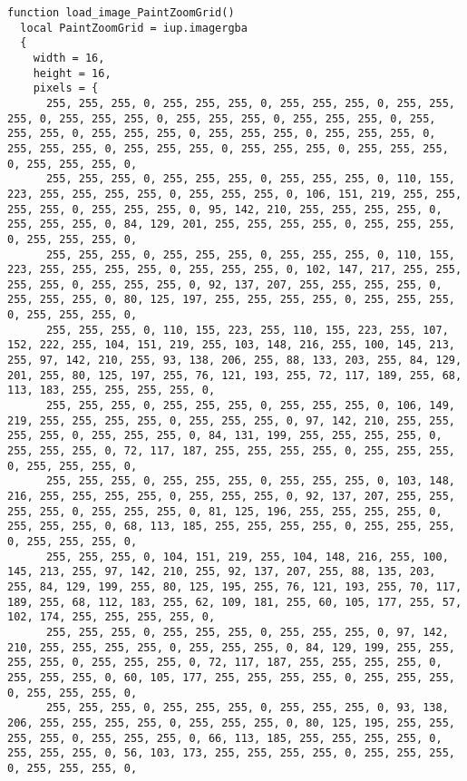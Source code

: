 \documentclass{ctexart}
\begin{document}
\begin{lstlisting}
function load_image_PaintZoomGrid()
  local PaintZoomGrid = iup.imagergba
  {
    width = 16,
    height = 16,
    pixels = {
      255, 255, 255, 0, 255, 255, 255, 0, 255, 255, 255, 0, 255, 255, 255, 0, 255, 255, 255, 0, 255, 255, 255, 0, 255, 255, 255, 0, 255, 255, 255, 0, 255, 255, 255, 0, 255, 255, 255, 0, 255, 255, 255, 0, 255, 255, 255, 0, 255, 255, 255, 0, 255, 255, 255, 0, 255, 255, 255, 0, 255, 255, 255, 0, 
      255, 255, 255, 0, 255, 255, 255, 0, 255, 255, 255, 0, 110, 155, 223, 255, 255, 255, 255, 0, 255, 255, 255, 0, 106, 151, 219, 255, 255, 255, 255, 0, 255, 255, 255, 0, 95, 142, 210, 255, 255, 255, 255, 0, 255, 255, 255, 0, 84, 129, 201, 255, 255, 255, 255, 0, 255, 255, 255, 0, 255, 255, 255, 0, 
      255, 255, 255, 0, 255, 255, 255, 0, 255, 255, 255, 0, 110, 155, 223, 255, 255, 255, 255, 0, 255, 255, 255, 0, 102, 147, 217, 255, 255, 255, 255, 0, 255, 255, 255, 0, 92, 137, 207, 255, 255, 255, 255, 0, 255, 255, 255, 0, 80, 125, 197, 255, 255, 255, 255, 0, 255, 255, 255, 0, 255, 255, 255, 0, 
      255, 255, 255, 0, 110, 155, 223, 255, 110, 155, 223, 255, 107, 152, 222, 255, 104, 151, 219, 255, 103, 148, 216, 255, 100, 145, 213, 255, 97, 142, 210, 255, 93, 138, 206, 255, 88, 133, 203, 255, 84, 129, 201, 255, 80, 125, 197, 255, 76, 121, 193, 255, 72, 117, 189, 255, 68, 113, 183, 255, 255, 255, 255, 0, 
      255, 255, 255, 0, 255, 255, 255, 0, 255, 255, 255, 0, 106, 149, 219, 255, 255, 255, 255, 0, 255, 255, 255, 0, 97, 142, 210, 255, 255, 255, 255, 0, 255, 255, 255, 0, 84, 131, 199, 255, 255, 255, 255, 0, 255, 255, 255, 0, 72, 117, 187, 255, 255, 255, 255, 0, 255, 255, 255, 0, 255, 255, 255, 0, 
      255, 255, 255, 0, 255, 255, 255, 0, 255, 255, 255, 0, 103, 148, 216, 255, 255, 255, 255, 0, 255, 255, 255, 0, 92, 137, 207, 255, 255, 255, 255, 0, 255, 255, 255, 0, 81, 125, 196, 255, 255, 255, 255, 0, 255, 255, 255, 0, 68, 113, 185, 255, 255, 255, 255, 0, 255, 255, 255, 0, 255, 255, 255, 0, 
      255, 255, 255, 0, 104, 151, 219, 255, 104, 148, 216, 255, 100, 145, 213, 255, 97, 142, 210, 255, 92, 137, 207, 255, 88, 135, 203, 255, 84, 129, 199, 255, 80, 125, 195, 255, 76, 121, 193, 255, 70, 117, 189, 255, 68, 112, 183, 255, 62, 109, 181, 255, 60, 105, 177, 255, 57, 102, 174, 255, 255, 255, 255, 0, 
      255, 255, 255, 0, 255, 255, 255, 0, 255, 255, 255, 0, 97, 142, 210, 255, 255, 255, 255, 0, 255, 255, 255, 0, 84, 129, 199, 255, 255, 255, 255, 0, 255, 255, 255, 0, 72, 117, 187, 255, 255, 255, 255, 0, 255, 255, 255, 0, 60, 105, 177, 255, 255, 255, 255, 0, 255, 255, 255, 0, 255, 255, 255, 0, 
      255, 255, 255, 0, 255, 255, 255, 0, 255, 255, 255, 0, 93, 138, 206, 255, 255, 255, 255, 0, 255, 255, 255, 0, 80, 125, 195, 255, 255, 255, 255, 0, 255, 255, 255, 0, 66, 113, 185, 255, 255, 255, 255, 0, 255, 255, 255, 0, 56, 103, 173, 255, 255, 255, 255, 0, 255, 255, 255, 0, 255, 255, 255, 0, 

\end{lstlisting}
\end{document}
